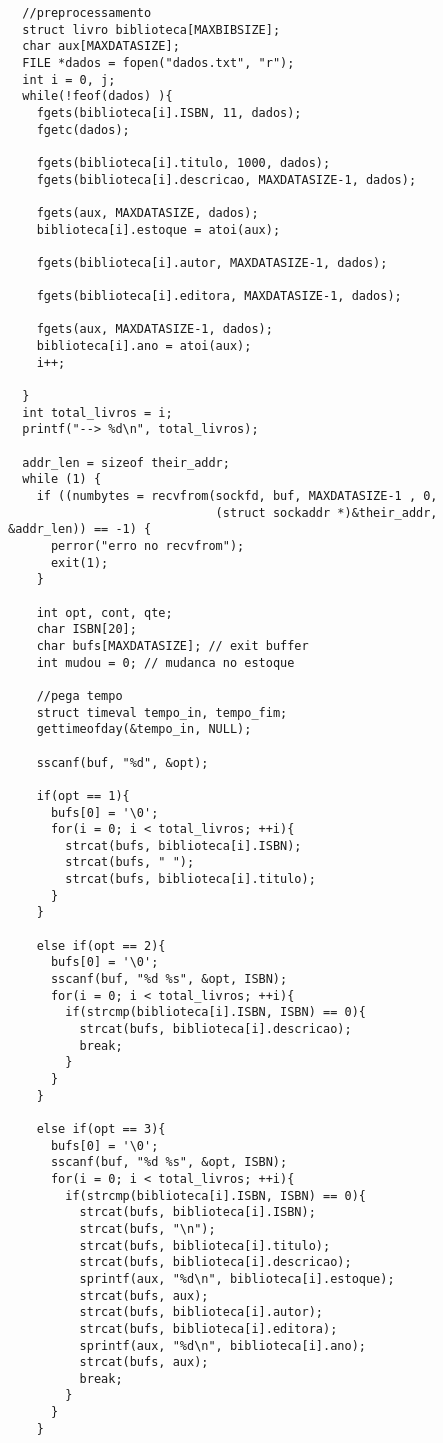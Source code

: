 \documentclass[11pt, brazil]{article} %
\begin{document}
\begin{verbatim}
  //preprocessamento
  struct livro biblioteca[MAXBIBSIZE];
  char aux[MAXDATASIZE];
  FILE *dados = fopen("dados.txt", "r");
  int i = 0, j;
  while(!feof(dados) ){
    fgets(biblioteca[i].ISBN, 11, dados);
    fgetc(dados);
		
    fgets(biblioteca[i].titulo, 1000, dados);
    fgets(biblioteca[i].descricao, MAXDATASIZE-1, dados);
		
    fgets(aux, MAXDATASIZE, dados);
    biblioteca[i].estoque = atoi(aux);
		
    fgets(biblioteca[i].autor, MAXDATASIZE-1, dados);
		
    fgets(biblioteca[i].editora, MAXDATASIZE-1, dados);
		
    fgets(aux, MAXDATASIZE-1, dados);
    biblioteca[i].ano = atoi(aux);
    i++;
		
  }
  int total_livros = i;
  printf("--> %d\n", total_livros);

  addr_len = sizeof their_addr;
  while (1) {
    if ((numbytes = recvfrom(sockfd, buf, MAXDATASIZE-1 , 0,
                             (struct sockaddr *)&their_addr, &addr_len)) == -1) {
      perror("erro no recvfrom");
      exit(1);
    }

    int opt, cont, qte;
    char ISBN[20];
    char bufs[MAXDATASIZE]; // exit buffer		    	
    int mudou = 0; // mudanca no estoque
		    	
    //pega tempo
    struct timeval tempo_in, tempo_fim;
    gettimeofday(&tempo_in, NULL);
		    	
    sscanf(buf, "%d", &opt);
		    	
    if(opt == 1){
      bufs[0] = '\0';
      for(i = 0; i < total_livros; ++i){
        strcat(bufs, biblioteca[i].ISBN);
        strcat(bufs, " ");
        strcat(bufs, biblioteca[i].titulo);
      }
    }
		    	
    else if(opt == 2){
      bufs[0] = '\0';
      sscanf(buf, "%d %s", &opt, ISBN);
      for(i = 0; i < total_livros; ++i){
        if(strcmp(biblioteca[i].ISBN, ISBN) == 0){
          strcat(bufs, biblioteca[i].descricao);
          break;
        }		    				
      }
    }
		    	
    else if(opt == 3){
      bufs[0] = '\0';
      sscanf(buf, "%d %s", &opt, ISBN);
      for(i = 0; i < total_livros; ++i){
        if(strcmp(biblioteca[i].ISBN, ISBN) == 0){
          strcat(bufs, biblioteca[i].ISBN);
          strcat(bufs, "\n");
          strcat(bufs, biblioteca[i].titulo);
          strcat(bufs, biblioteca[i].descricao);
          sprintf(aux, "%d\n", biblioteca[i].estoque);
          strcat(bufs, aux);
          strcat(bufs, biblioteca[i].autor);
          strcat(bufs, biblioteca[i].editora);
          sprintf(aux, "%d\n", biblioteca[i].ano);
          strcat(bufs, aux);
          break;
        }		    				
      }
    }
		    

\end{verbatim}
\end{document}
